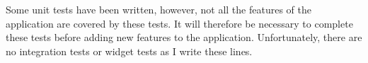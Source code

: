 Some unit tests have been written, however, not all the features of the application are covered by these tests. It will therefore be necessary to complete these tests before adding new features to the application. Unfortunately, there are no integration tests or widget tests as I write these lines.





